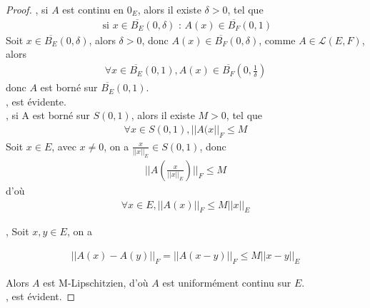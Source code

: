\documentclass{report}
\begin{document}
{\begin{proof}
, si $A$ est continu en $0_{E}$, alors il existe $\delta > 0$, tel que 
			\begin{align*}
				\,\,\text{si}\,\, x \in \overline{B_{E}}(0,\delta)  \,\,\text{:}\,\,  A(x) \in \overline{B_{F}}(0,1)
			\end{align*}
Soit $x \in \overline{B_{E}}(0,\delta)$, alors $\delta > 0$, donc $A(x) \in \overline{B_{F}}(0,\delta)$, comme $A \in \mathscr{L}(E,F)$, alors 		
			\begin{align*}
				\forall x \in \overline{B_{E}}(0,1), A(x) \in \overline{B_{F}}(0,\frac{1}{\delta})	
			\end{align*}
donc $A$ est  borné sur $\overline{B_{E}}(0,1)$.	\\

, est évidente.	\\

, si A est  borné sur $S(0,1)$, alors il existe $M > 0$, tel que 	\\
			\begin{align*}
				\forall x \in S(0,1), ||A(x||_{F} \le M
			\end{align*}
Soit $x \in E$, avec $x\neq 0$, on a $\frac{x}{||x||_{E}} \in S(0,1)$, donc 		\\

			\begin{align*}
				||A(\frac{x}{||x||_{E}})||_{F} \le M
			\end{align*}
d'où 			
			\begin{align*}
				\forall x \in E, ||A(x)||_{F} \le M ||x||_{E}
			\end{align*}

, Soit $x, y \in E$, on a 

			\begin{align*}
				||A(x) - A(y)||_{F} = ||A(x-y)||_{F} \le M ||x-y||_{E}
			\end{align*}

Alors $A$ est M-Lipschitzien, d'où $A$ est uniformément continu sur $E$.		\\

, est évident.		
\end{proof}



}
\end{document}
